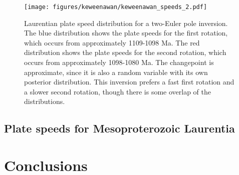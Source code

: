 \documentclass[preprint,12pt,authoryear]{elsarticle}
\begin{document}
\begin{figure}
\texttt{[image: figures/keweenawan/keweenawan\_speeds\_2.pdf]}
\caption[Laurentian plate speed distribution for a two-Euler pole inversion]{Laurentian plate speed distribution for a two-Euler pole inversion. The blue distribution shows the plate speeds for the first rotation, which occurs from approximately 1109-1098 Ma. The red distribution shows the plate speeds for the second rotation, which occurs from approximately 1098-1080 Ma. The changepoint is approximate, since it is also a random variable with its own posterior distribution. This inversion prefers a fast first rotation and a slower second rotation, though there is some overlap of the distributions.}
\label{fig:keweenawan_speeds_2}
\end{figure}
\subsection{Plate speeds for Mesoproterozoic Laurentia}

\section{Conclusions}
\label{sec:conclusions}





 


\end{document}
